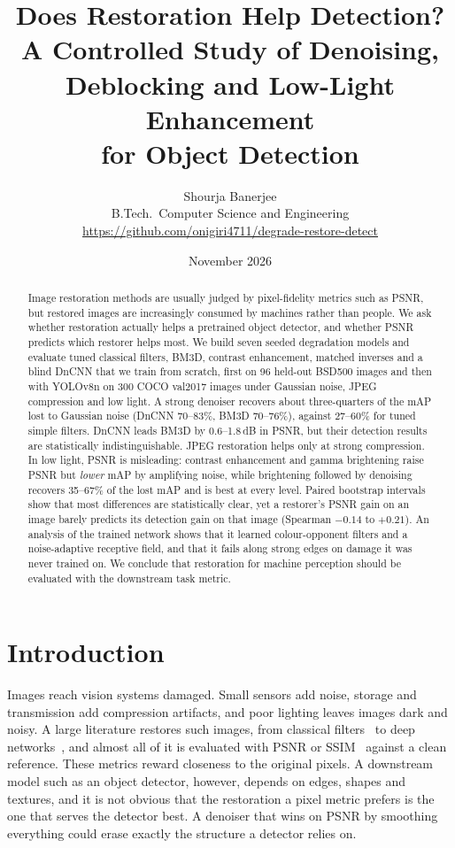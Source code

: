 \documentclass[11pt]{article}
\title{\textbf{Does Restoration Help Detection?}\\[2pt]
\large A Controlled Study of Denoising, Deblocking and Low-Light Enhancement\\ for Object Detection}
\author{Shourja Banerjee\\[2pt]
\small B.Tech.\ Computer Science and Engineering\\
\small \url{https://github.com/onigiri4711/degrade-restore-detect}}
\date{November 2026}
\begin{document}
\maketitle

\begin{abstract}
\noindent
Image restoration methods are usually judged by pixel-fidelity metrics such as PSNR, but restored images are increasingly consumed by machines rather than people. We ask whether restoration actually helps a pretrained object detector, and whether PSNR predicts which restorer helps most. We build seven seeded degradation models and evaluate tuned classical filters, BM3D, contrast enhancement, matched inverses and a blind DnCNN that we train from scratch, first on 96 held-out BSD500 images and then with YOLOv8n on 300 COCO val2017 images under Gaussian noise, JPEG compression and low light. A strong denoiser recovers about three-quarters of the mAP lost to Gaussian noise (DnCNN 70--83\%, BM3D 70--76\%), against 27--60\% for tuned simple filters. DnCNN leads BM3D by 0.6--1.8\,dB in PSNR, but their detection results are statistically indistinguishable. JPEG restoration helps only at strong compression. In low light, PSNR is misleading: contrast enhancement and gamma brightening raise PSNR but \emph{lower} mAP by amplifying noise, while brightening followed by denoising recovers 35--67\% of the lost mAP and is best at every level. Paired bootstrap intervals show that most differences are statistically clear, yet a restorer's PSNR gain on an image barely predicts its detection gain on that image (Spearman $-0.14$ to $+0.21$). An analysis of the trained network shows that it learned colour-opponent filters and a noise-adaptive receptive field, and that it fails along strong edges on damage it was never trained on. We conclude that restoration for machine perception should be evaluated with the downstream task metric.
\end{abstract}

\section{Introduction}
\label{sec:intro}

Images reach vision systems damaged. Small sensors add noise, storage and transmission add compression artifacts, and poor lighting leaves images dark and noisy. A large literature restores such images, from classical filters~\citep{tomasi1998bilateral,buades2005nlmeans,dabov2007bm3d} to deep networks~\citep{zhang2017dncnn,zhang2018ffdnet,guo2019cbdnet}, and almost all of it is evaluated with PSNR or SSIM~\citep{wang2004ssim} against a clean reference. These metrics reward closeness to the original pixels. A downstream model such as an object detector, however, depends on edges, shapes and textures, and it is not obvious that the restoration a pixel metric prefers is the one that serves the detector best. A denoiser that wins on PSNR by smoothing everything could erase exactly the structure a detector relies on.
\end{document}
